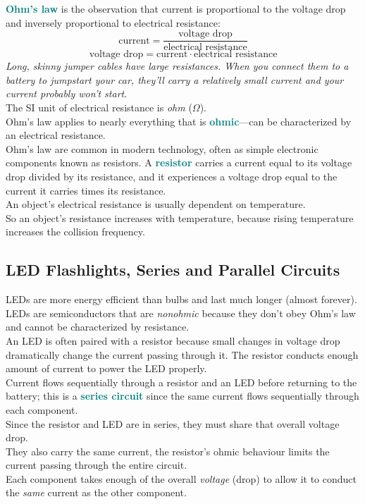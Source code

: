 \documentclass[12pt]{article}
\theoremstyle{definition}
\newcommand{\defnterm}[1]{\textbf{\textcolor{teal}{#1}}\index{#1}}
\begin{document}
\defnterm{Ohm's law} is the observation that current is proportional to the voltage drop and inversely proportional to electrical resistance:
$$\text{current} = \frac{\text{voltage drop}}{\text{electrical resistance}}$$
$$\text{voltage drop} = \text{current} \cdot \text{electrical resistance}$$
\emph{Long, skinny jumper cables have large resistances. When you connect them to a battery to jumpstart your car, they'll carry a relatively small current and your current probably won't start}. \\
The SI unit of electrical resistance is \emph{ohm} ($\Omega$). \\

Ohm's law applies to nearly everything that is \defnterm{ohmic}---can be characterized by an electrical resistance. \\
Ohm's law are common in modern technology, often as simple electronic components known as resistors.
A \defnterm{resistor} carries a current equal to its voltage drop divided by its resistance, and it experiences a voltage drop equal to the current it carries times its resistance. \\

An object's electrical resistance is usually dependent on temperature. \\
So an object's resistance increases with temperature, because rising temperature increases the collision frequency.

\subsection{LED Flashlights, Series and Parallel Circuits}
LEDs are more energy efficient than bulbs and last much longer (almost forever). \\
LEDs are semiconductors that are \emph{nonohmic} because they don't obey Ohm's law and cannot be characterized by resistance. \\
An LED is often paired with a resistor because small changes in voltage drop dramatically change the current passing through it.
The resistor conducts enough amount of current to power the LED properly. \\

Current flows sequentially through a resistor and an LED before returning to the battery;
this is a \defnterm{series circuit} since the same current flows sequentially through each component. \\
Since the resistor and LED are in series, they must share that overall voltage drop. \\
They also carry the same current, the resistor's ohmic behaviour limits the current passing through the entire circuit. \\
Each component takes enough of the overall \emph{voltage} (drop) to allow it to conduct the \emph{same} current as the other component. \\
\end{document}
